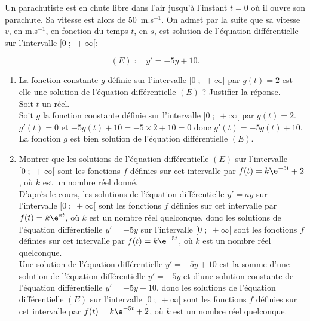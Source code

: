 \documentclass[a4paper,11pt,exos]{nsi}
\begin{document}
\maketitle

\exo{}
Un parachutiste est en chute libre dans l'air jusqu'à l'instant $t = 0$ où il ouvre son parachute. Sa vitesse est alors de 50~m.s$^{-1}$. On admet par la suite que sa vitesse $v$, en m.s$^{-1}$, en fonction du temps $t$, en $s$, est solution de l'équation différentielle sur l'intervalle $[0\;;\;+\infty[$:

\[(E)\;:\quad y'=-5y+10.\]



\begin{enumerate}
    \item La fonction constante $g$ définie sur l'intervalle $[0\;;\;+\infty[$ par $g(t)=2$ est-elle une solution de l'équation différentielle $(E)$ ? 
    Justifier la réponse.\\[.5em]
    \textcolor{UGLiBlue}{
        Soit $t$ un réel.\\
        Soit $g$ la fonction constante définie sur l'intervalle $[0\;;\;+\infty[$ par $g(t)=2$.\\
        $g'(t)=0$ et $-5g(t)+10=-5\times 2 +10=0$ donc $g'(t)=-5g(t)+10$.\\
        La fonction $g$ est bien solution de l'équation différentielle $(E)$.
    }

    \item Montrer que les solutions de l'équation différentielle $(E)$ sur l'intervalle $[0\;;\;+\infty[$ sont les fonctions $f$ définies sur cet intervalle par $f(t)=k\e^{-5t}+2$, où $k$ est un nombre réel donné.\\[.5em]
    \textcolor{UGLiBlue}{
        D'après le cours, les solutions de l'équation différentielle $y'=ay$ sur l'intervalle $[0\;;\;+\infty[$ sont les fonctions $f$ définies sur cet intervalle par $f(t)=k\e^{at}$,  où $k$ est un nombre réel quelconque, donc les solutions de l'équation différentielle $y'=-5y$ sur l'intervalle $[0\;;\;+\infty[$ sont les fonctions $f$ définies sur cet intervalle par $f(t)=k\e^{-5t}$,  où $k$ est un nombre réel quelconque.\\[.5em]
        Une solution de l'équation différentielle $y'=-5y+10$ est la somme d'une solution de l'équation différentielle $y'=-5y$ et d'une solution constante de l'équation différentielle $y'=-5y+10$, donc les solutions de l'équation différentielle $(E)$ sur l'intervalle $[0\;;\;+\infty[$ sont les fonctions $f$ définies sur cet intervalle par $f(t)=k\e^{-5t}+2$,  où $k$ est un nombre réel quelconque.
    }


\end{enumerate}
\end{document}
